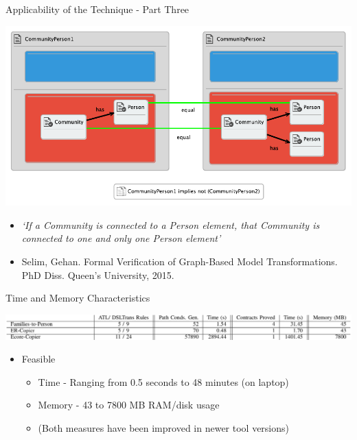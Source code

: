 \documentclass[xcolor=dvipsnames, 12pt]{beamer}
\begin{document}
\begin{frame}{Applicability of the Technique - Part Three}
\begin{center}
\includegraphics[width=\textwidth]{figures/communityPersonProp}
\end{center}
\pause
\small
\vspace{-0.8cm}
\begin{itemize}
\item \textit{`If a Community is connected to a Person element, that Community is connected
to one and only one Person element'}
\item Selim, Gehan. Formal Verification of Graph-Based Model Transformations. PhD Diss. Queen’s University, 2015.
\end{itemize}
\end{frame}

\begin{frame}{Time and Memory Characteristics}
\begin{center}
\includegraphics[width=\textwidth]{figures/top_table}
\end{center}
\pause
\begin{itemize}
\item Feasible
\begin{itemize}[<+->]
\item Time - Ranging from 0.5 seconds to 48 minutes (on laptop)
\item Memory - 43 to 7800 MB RAM/disk usage
\item (Both measures have been improved in newer tool versions)
\end{itemize}
\end{itemize}
\end{frame}
\end{document}
